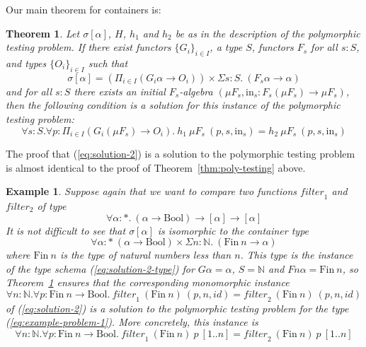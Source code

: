 \documentclass{article}[12 pt]
\newtheorem{thm}{Theorem}
\newtheorem{example}{Example}
\theoremstyle{problemstyle}
\begin{document}
Our main theorem for containers is:

\begin{thm}\label{thm:dep-containers}
Let $\sigma[\alpha]$, $H$, $h_1$ and $h_2$ be as in the description of
the polymorphic testing problem. If there exist
functors $\{G_i\}_{i \in I}$, a type $S$, functors $F_s$ for all $s :
S$, and types $\{O_i\}_{i \in I}$ such that
\begin{equation}
  \label{eq:solution-2-type}
  \sigma[\alpha] = \left(\Pi_{i \in I} (G_i \alpha \to O_i)\right)
  \times \Sigma s : S.~(F_s \alpha \to \alpha)
\end{equation}
and for all $s : S$ there exists an initial $F_s$-algebra $(\mu F_s,
\mathrm{in}_s : F_s(\mu F_s) \to \mu F_s)$, then the following
condition is a solution for this instance of the polymorphic testing
problem:
\begin{equation}
  \label{eq:solution-2}
  \forall s : S. \forall p : \Pi_{i \in I}(G_i(\mu F_s) \to
  O_i).~h_1~\mu F_s~(p, s, \mathrm{in}_s) = h_2~\mu F_s~(p, s,
  \mathrm{in}_s)
\end{equation}
\end{thm}
\noindent
The proof that (\ref{eq:solution-2}) is a solution to the polymorphic
testing problem is almost identical to the proof of
Theorem~\ref{thm:poly-testing} above.

\begin{example} 
Suppose again that we want to compare two functions
$\mathit{filter}_1$ and $\mathit{filter_2}$ of type
  \begin{equation} 
   \label{eq:example-problem-1-again}
    \forall \alpha : *.~(\alpha \to \mathrm{Bool}) \to
            [\alpha] \to [\alpha]
  \end{equation}
It is not difficult to see that $\sigma[\alpha]$ is {\em isomorphic}
to the container type
  \begin{displaymath}
    \forall \alpha : *~(\alpha \to \mathrm{Bool}) \times \Sigma n :
    \mathbb{N}.~(\mathrm{Fin}~n \to \alpha)
  \end{displaymath}
  where $\mathrm{Fin}~n$ is the type of natural numbers less than $n$.
  This type is the instance of the type schema
  (\ref{eq:solution-2-type}) for $G\alpha = \alpha$, $S = \mathbb{N}$
  and $Fn\alpha = \mathrm{Fin}~n$, so Theorem~\ref{thm:dep-containers}
  ensures that the corresponding monomorphic instance
  \begin{displaymath}
  \forall n : \mathbb{N}. \forall p : \mathrm{Fin}~n \to
  \mathrm{Bool}.~\mathit{filter}_1~(\mathrm{Fin}~n)~(p, n,
  \mathit{id}) = \mathit{filter}_2~(\mathrm{Fin}~n)~(p, n,
  \mathit{id})
  \end{displaymath}
  of (\ref{eq:solution-2}) is a solution to the polymorphic testing
  problem for the type (\ref{eq:example-problem-1}). More concretely,
  this instance is
  \begin{equation}\label{eq:filter-final}
  \forall n : \mathbb{N}. \forall p : \mathrm{Fin}~n \to
  \mathrm{Bool}.~\mathit{filter}_1~(\mathrm{Fin}~n)~p~[1..n] =
  \mathit{filter}_2~(\mathrm{Fin}~n)~p~[1..n]
  \end{equation}
\end{example}
\end{document}
